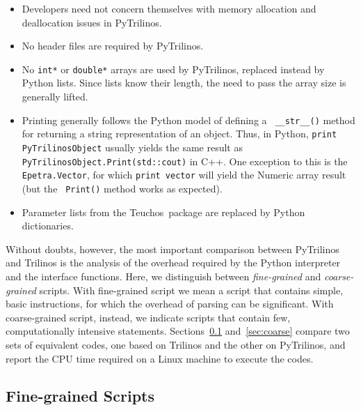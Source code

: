 \documentclass[acmtocl]{acmtrans2m}
\newcommand{\PyTrilinos}{{PyTrilinos}}
\newcommand{\teuchos}{{Teuchos}}
\begin{document}
\begin{itemize}

\item Developers need not concern themselves with memory allocation
  and deallocation issues in \PyTrilinos.

\item No header files are required by \PyTrilinos.

\item No {\tt int*} or {\tt double*} arrays are used by \PyTrilinos,
  replaced instead by Python lists.  Since lists know their length,
  the need to pass the array size is generally lifted.

\item Printing generally follows the Python model of defining a {\tt
  \_\_str\_\_()} method for returning a string representation of an
  object.  Thus, in Python, {\tt print PyTrilinosObject} usually
  yields the same result as {\tt PyTrilinosObject.Print(std::cout)} in
  C++.  One exception to this is the {\tt Epetra.Vector}, for which
  {\tt print vector} will yield the Numeric array result (but the {\tt
    Print()} method works as expected).

\item Parameter lists from the \teuchos\ package are replaced by Python
  dictionaries.

\end{itemize}

Without doubts, however, the most important comparison between PyTrilinos and
Trilinos is the analysis of the overhead required by the Python interpreter
and the interface functions. Here, we distinguish between {\sl fine-grained}
and {\sl coarse-grained} scripts. With fine-grained script we mean a script
that contains simple, basic instructions, for which the overhead of parsing
can be significant. With coarse-grained script, instead, we indicate scripts
that contain few, computationally intensive statements.
Sections~\ref{sec:fine} and~\ref{sec:coarse}
compare two sets of equivalent codes, one based on Trilinos and the other on
PyTrilinos, and report the CPU time required on a Linux machine to execute the
codes.

\subsection{Fine-grained Scripts}
\label{sec:fine}
\end{document}
